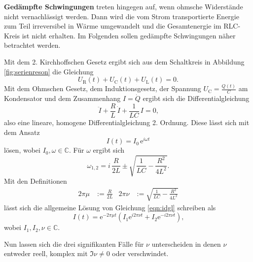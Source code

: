 \textbf{Gedämpfte Schwingungen} treten hingegen auf, wenn ohmsche Widerstände nicht vernachlässigt werden.
Dann wird die vom Strom transportierte Energie zum Teil irreversibel in Wärme
umgewandelt und die Gesamtenergie im RLC-Kreis ist nicht erhalten. Im Folgenden sollen gedämpfte
Schwingungen näher betrachtet werden.

Mit dem 2. Kirchhoffschen Gesetz ergibt sich aus dem Schaltkreis in Abbildung \ref{fig:serienreson} die Gleichung
\begin{equation*}
	U_{\text{R}}(t) + U_{\text{C}}(t) + U_{\text{L}}(t) = 0 \text{.}
\end{equation*}
Mit dem Ohmschen Gesetz, dem Induktionsgesetz, der Spannung $U_{\text{C}} = \frac{Q(t)}{C}$ am Kondensator und dem Zusammenhang $I = \dot{Q}$ ergibt sich die Differentialgleichung
\begin{equation}
	\ddot{I} + \frac{R}{L} \, \dot{I} + \frac{1}{LC} \, I = 0 \text{,}
	\label{eqn:idgl}
\end{equation}
also eine lineare, homogene Differentialgleichung 2. Ordnung.
Diese lässt sich mit dem Ansatz
\begin{equation}
	I(t) = I_0 \, \mathrm{e}^{i \omega t}
\end{equation}
lösen, wobei $I_0, \omega \in \mathbb{C}$.
Für $\omega$ ergibt sich
\begin{equation}
	\omega_{1,2} = i \, \frac{R}{2L} \pm \sqrt{\frac{1}{LC} - \frac{R^2}{4L^2}} \text{.}
\end{equation}
Mit den Definitionen
\begin{align}
	2 \pi \mu & := \frac{R}{2L} & 2 \pi \nu & := \sqrt{\frac{1}{LC} - \frac{R^2}{4L^2}}
	\label{eqn:defis}
\end{align}
lässt sich die allgemeine Lösung von Gleichung \eqref{eqn:idgl} schreiben als
\begin{equation}
	I(t) = \mathrm{e}^{-2 \pi \mu t} (I_1 \mathrm{e}^{i 2 \pi \nu t} + I_2 \mathrm{e}^{-i 2 \pi \nu t}) \text{,}
\end{equation}
wobei $I_1, I_2, \nu \in \mathbb{C}$.

Nun lassen sich die drei signifikanten Fälle für $\nu$ unterscheiden in denen $\nu$ entweder reell, komplex mit $\Im \nu \neq 0$ oder verschwindet.

